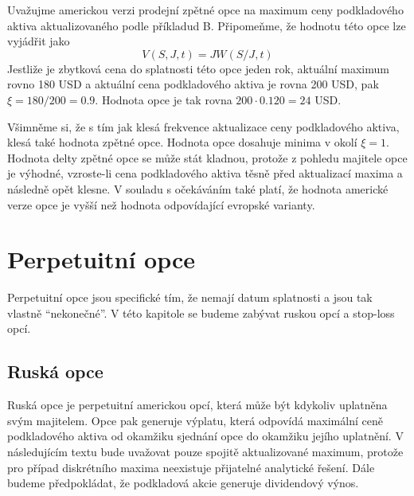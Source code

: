 \documentclass[a4paper]{book}
\begin{document}
Uvažujme americkou verzi prodejní zpětné opce na maximum ceny podkladového aktiva aktualizovaného podle příkladud B. Připomeňme, že hodnotu této opce lze vyjádřit jako
\begin{equation*}
V(S,J,t) = JW(S/J,t)
\end{equation*}
Jestliže je zbytková cena do splatnosti této opce jeden rok, aktuální maximum rovno 180 USD a aktuální cena podkladového aktiva je rovna 200 USD, pak $\xi = 180 / 200 = 0.9$. Hodnota opce je tak rovna $200 \cdot 0.120 = 24$ USD.

Všimněme si, že s tím jak klesá frekvence aktualizace ceny podkladového aktiva, klesá také hodnota zpětné opce. Hodnota opce dosahuje minima v okolí $\xi = 1$. Hodnota delty zpětné opce se může stát kladnou, protože z pohledu majitele opce je výhodné, vzroste-li cena podkladového aktiva těsně před aktualizací maxima a následně opět klesne. V souladu s očekáváním také platí, že hodnota americké verze opce je vyšší než hodnota odpovídající evropské varianty.

\section{Perpetuitní opce}

Perpetuitní opce jsou specifické tím, že nemají datum splatnosti a jsou tak vlastně ``nekonečné''. V této kapitole se budeme zabývat ruskou opcí a stop-loss opcí.

\subsection{Ruská opce}

Ruská opce je perpetuitní americkou opcí, která může být kdykoliv uplatněna svým majitelem. Opce pak generuje výplatu, která odpovídá maximální ceně podkladového aktiva od okamžiku sjednání opce do okamžiku jejího uplatnění. V následujícím textu bude uvažovat pouze spojitě aktualizované maximum, protože pro případ diskrétního maxima neexistuje přijatelné analytické řešení. Dále budeme předpokládat, že podkladová akcie generuje dividendový výnos.
\end{document}
